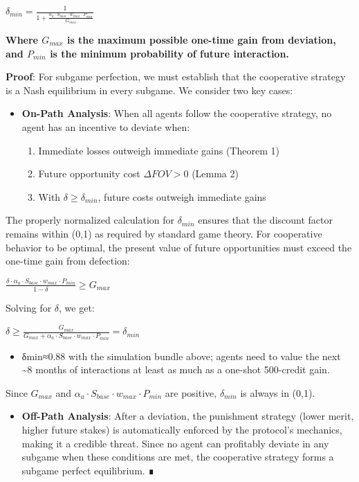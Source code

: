 \documentclass[11pt]{article}
\begin{document}
\(\delta_{min} = \frac{1}{1 + \frac{\alpha_a \cdot S_{base} \cdot w_{max} \cdot P_{min}}{G_{max}}}\)

\textbf{Where \(G_{max}\) is the maximum possible one-time gain from deviation, and \(P_{min}\) is the minimum probability of future interaction.}

\textbf{Proof}:
For subgame perfection, we must establish that the cooperative strategy is a Nash equilibrium in every subgame. We consider two key cases:

\begin{itemize}
\item \textbf{On-Path Analysis}: When all agents follow the cooperative strategy, no agent has an incentive to deviate when:
\begin{enumerate}
\item Immediate losses outweigh immediate gains (Theorem 1)
\item Future opportunity cost \(\Delta FOV > 0\) (Lemma 2)
\item With \(\delta \geq \delta_{min}\), future costs outweigh immediate gains
\end{enumerate}
\end{itemize}

The properly normalized calculation for \(\delta_{min}\) ensures that the discount factor remains within (0,1) as required by standard game theory. For cooperative behavior to be optimal, the present value of future opportunities must exceed the one-time gain from defection:

\(\frac{\delta \cdot \alpha_a \cdot S_{base} \cdot w_{max} \cdot P_{min}}{1-\delta} \geq G_{max}\)

Solving for \(\delta\), we get:

\(\delta \geq \frac{G_{max}}{G_{max} + \alpha_a \cdot S_{base} \cdot w_{max} \cdot P_{min}} = \delta_{min}\)

\begin{itemize}
\item δmin≈0.88 with the simulation bundle above; agents need to value the next \textasciitilde{}8 months of interactions at least as much as a one-shot 500-credit gain.
\end{itemize}

Since \(G_{max}\) and \(\alpha_a \cdot S_{base} \cdot w_{max} \cdot P_{min}\) are positive, \(\delta_{min}\) is always in (0,1).

\begin{itemize}
\item \textbf{Off-Path Analysis}: After a deviation, the punishment strategy (lower merit, higher future stakes) is automatically enforced by the protocol's mechanics, making it a credible threat. Since no agent can profitably deviate in any subgame when these conditions are met, the cooperative strategy forms a subgame perfect equilibrium. ∎
\end{itemize}
\end{document}
